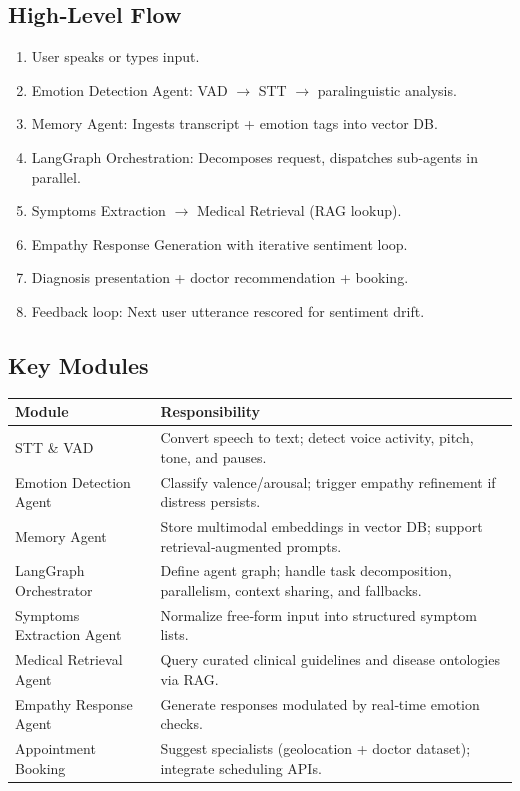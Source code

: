 \documentclass[11pt,a4paper]{article}
\begin{document}
\subsection{High‐Level Flow}
\begin{enumerate}[left=0pt]
  \item User speaks or types input.
  \item Emotion Detection Agent: VAD $\to$ STT $\to$ paralinguistic analysis.
  \item Memory Agent: Ingests transcript + emotion tags into vector DB.
  \item LangGraph Orchestration: Decomposes request, dispatches sub‐agents in parallel.
  \item Symptoms Extraction $\to$ Medical Retrieval (RAG lookup).
  \item Empathy Response Generation with iterative sentiment loop.
  \item Diagnosis presentation + doctor recommendation + booking.
  \item Feedback loop: Next user utterance rescored for sentiment drift.
\end{enumerate}

\subsection{Key Modules}
\begin{longtable}{@{}p{}p{}@{}}
\toprule
\textbf{Module} & \textbf{Responsibility} \\
\midrule
STT \& VAD & Convert speech to text; detect voice activity, pitch, tone, and pauses. \\
Emotion Detection Agent & Classify valence/arousal; trigger empathy refinement if distress persists. \\
Memory Agent & Store multimodal embeddings in vector DB; support retrieval‐augmented prompts. \\
LangGraph Orchestrator & Define agent graph; handle task decomposition, parallelism, context sharing, and fallbacks. \\
Symptoms Extraction Agent & Normalize free‐form input into structured symptom lists. \\
Medical Retrieval Agent & Query curated clinical guidelines and disease ontologies via RAG. \\
Empathy Response Agent & Generate responses modulated by real‐time emotion checks. \\
Appointment Booking & Suggest specialists (geolocation + doctor dataset); integrate scheduling APIs. \\
\bottomrule
\end{longtable}
\end{document}
